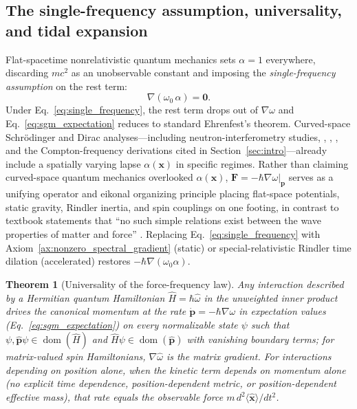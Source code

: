 \documentclass[aps,prd,onecolumn,tightenlines,nofootinbib,notitlepage,10pt,floatfix]{revtex4-2}
\theoremstyle{indentedtheorem}
\newtheorem{theorem}{Theorem}
\begin{document}
\subsection{The single-frequency assumption, universality, and tidal expansion}
\label{sec:single_frequency}

Flat-spacetime nonrelativistic quantum mechanics sets $\alpha=1$ everywhere, discarding $mc^2$ as an unobservable constant \citep{Dirac1947Principles,Feynman1965Lectures3} and imposing the \emph{single-frequency assumption} on the rest term:
\begin{equation}
    \nabla(\omega_0\,\alpha) = \mathbf{0} .
    \label{eq:single_frequency}
\end{equation}
Under Eq.~\eqref{eq:single_frequency}, the rest term drops out of $\nabla\omega$ and Eq.~\eqref{eq:sgm_expectation} reduces to standard Ehrenfest's theorem. Curved-space Schr\"odinger and Dirac analyses---including neutron-interferometry studies, \citet{HehlNi1990Inertial}, \citet{ObukhovSilenkoTeryaev2011Dirac}, \citet{Perche2022Localized}, and the Compton-frequency derivations cited in Section~\ref{sec:intro}---already include a spatially varying lapse $\alpha(\mathbf{x})$ in specific regimes. Rather than claiming curved-space quantum mechanics overlooked $\alpha(\mathbf{x})$, $\mathbf{F}=-\hbar\nabla\omega|_{\mathbf{p}}$ serves as a unifying operator and eikonal organizing principle placing flat-space potentials, static gravity, Rindler inertia, and spin couplings on one footing, in contrast to textbook statements that ``no such simple relations exist between the wave properties of matter and force'' \citep{Bohm1951Quantum}. Replacing Eq.~\eqref{eq:single_frequency} with Axiom~\ref{ax:nonzero_spectral_gradient} (static) or special-relativistic Rindler time dilation (accelerated) restores $-\hbar\nabla(\omega_0\alpha)$.

\begin{theorem}[Universality of the force-frequency law]\label{thm:universal}
Any interaction described by a Hermitian quantum Hamiltonian $\hat{H}=\hbar\hat{\omega}$ in the unweighted inner product drives the canonical momentum at the rate $\dot{\mathbf{p}}=-\hbar\nabla\omega$ in expectation values (Eq.~\eqref{eq:sgm_expectation}) on every normalizable state $\psi$ such that $\psi,\hat{\mathbf{p}}\psi\in\operatorname{dom}(\hat{H})$ and $\hat{H}\psi\in\operatorname{dom}(\hat{\mathbf{p}})$ with vanishing boundary terms; for matrix-valued spin Hamiltonians, $\nabla\hat{\omega}$ is the matrix gradient. For interactions depending on position alone, when the kinetic term depends on momentum alone (no explicit time dependence, position-dependent metric, or position-dependent effective mass), that rate equals the observable force $m\,d^2\langle\hat{\mathbf{x}}\rangle/dt^2$.
\end{theorem}
\end{document}
